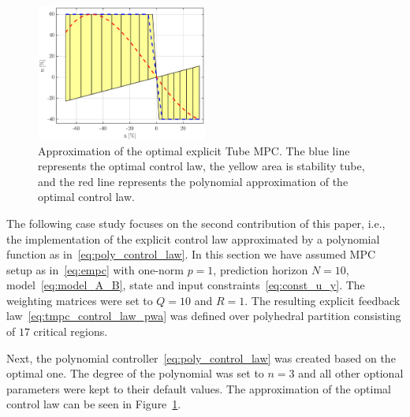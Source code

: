 \documentclass[letterpaper, 10 pt, conference]{ieeeconf}
\newcommand{\polydegree}{n}
\begin{document}
\begin{figure}[bp!]
	\begin{center}
		\includegraphics[width=0.5\textwidth]{images/approximation.eps}
		\caption{Approximation of the optimal explicit Tube MPC. The blue line represents the optimal control law, the yellow area is stability tube, and the red line represents the polynomial approximation of the optimal control law.}
		\label{fig:approx}
	\end{center}
\end{figure}

The following case study focuses on the second contribution of this paper, i.e., the implementation of the explicit control law approximated by a polynomial function as in~\eqref{eq:poly_control_law}. 
%
In this section we have assumed MPC setup as in~\eqref{eq:empc} with one-norm $p = 1$, prediction horizon $N = 10$, model~\eqref{eq:model_A_B}, state and input constraints~\eqref{eq:const_u_y}. The weighting matrices were set to $Q = 10$ and $R = 1$.
%
The resulting explicit feedback law~\eqref{eq:tmpc_control_law_pwa} was defined over polyhedral partition consisting of $17$ critical regions.

Next, the polynomial controller~\eqref{eq:poly_control_law} was created based on the optimal one. The degree of the polynomial was set to $\polydegree = 3$ and all other optional parameters were kept to their default values. The approximation of the optimal control law can be seen in Figure~\ref{fig:approx}.




\end{document}
